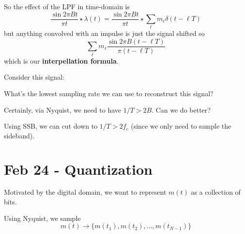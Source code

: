 \documentclass[12pt]{report}
\newcommand*{\tbf}[1]{\ifmmode\mathbf{#1}\else\textbf{#1}\fi}
\begin{document}
So the effect of the LPF in time-domain is 
\[\frac{\sin 2\pi B t}{\pi t} \star \lambda(t) = \frac{\sin 2\pi B t}{\pi t} \star \sum_{\ell} m_{\ell} \delta(t - \ell T)\]
but anything convolved with an impulse is just the signal shifted so 
\[\sum_{\ell} m_{\ell} \frac{\sin 2\pi B(t - \ell T)}{\pi(t - \ell T)}\]
which is our \tbf{interpellation formula}. 

Consider this signal:
    \begin{center}
    \end{center}

What's the lowest sampling rate we can use to reconstruct this signal?

Certainly, via Nyquist, we need to have $1/T > 2B$. Can we do better? 

Using SSB, we can cut down to $1/T > 2f_c$ (since we only need to sample the sideband).

\section{Feb 24 - Quantization} 

Motivated by the digital domain, we want to represent $m(t)$ as a collection of bits. 

Using Nyquist, we sample 
\[m(t) \to \{m(t_1), m(t_2), \dots, m(t_{N-1})\}\]

\begin{center}
\end{center}
\end{document}
